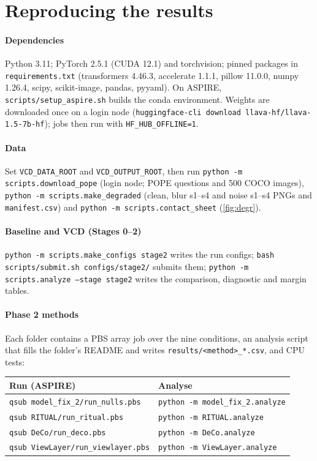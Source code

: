 \documentclass[10pt,a4paper]{article}
\newcommand{\code}[1]{\texttt{\small #1}}
\begin{document}
\section{Reproducing the results}\label{app:repro}
\begingroup\raggedright\setlength{\parindent}{0pt}
\paragraph{Dependencies} Python 3.11; PyTorch 2.5.1 (CUDA 12.1) and torchvision; pinned packages in \code{requirements.txt} (transformers 4.46.3, accelerate 1.1.1, pillow 11.0.0, numpy 1.26.4, scipy, scikit-image, pandas, pyyaml). On ASPIRE, \code{scripts/setup\_aspire.sh} builds the conda environment. Weights are downloaded once on a login node (\code{huggingface-cli download llava-hf/llava-1.5-7b-hf}); jobs then run with \code{HF\_HUB\_OFFLINE=1}.

\paragraph{Data} Set \code{VCD\_DATA\_ROOT} and \code{VCD\_OUTPUT\_ROOT}, then run \code{python -m scripts.download\_pope} (login node; POPE questions and 500 COCO images), \code{python -m scripts.make\_degraded} (clean, blur s1--s4 and noise s1--s4 PNGs and \code{manifest.csv}) and \code{python -m scripts.contact\_sheet} (\cref{fig:degr}).

\paragraph{Baseline and VCD (Stages 0--2)} \code{python -m scripts.make\_configs stage2} writes the run configs; \code{bash scripts/submit.sh configs/stage2/} submits them; \code{python -m scripts.analyze --stage stage2} writes the comparison, diagnostic and margin tables.

\paragraph{Phase 2 methods} Each folder contains a PBS array job over the nine conditions, an analysis script that fills the folder's README and writes \code{results/<method>\_*.csv}, and CPU tests:

\begin{center}\small
\begin{tabular}{@{}ll@{}}
\toprule
Run (ASPIRE) & Analyse\\
\midrule
\code{qsub model\_fix\_2/run\_nulls.pbs} & \code{python -m model\_fix\_2.analyze}\\
\code{qsub RITUAL/run\_ritual.pbs} & \code{python -m RITUAL.analyze}\\
\code{qsub DeCo/run\_deco.pbs} & \code{python -m DeCo.analyze}\\
\code{qsub ViewLayer/run\_viewlayer.pbs} & \code{python -m ViewLayer.analyze}\\
\bottomrule
\end{tabular}
\end{center}
\end{document}
